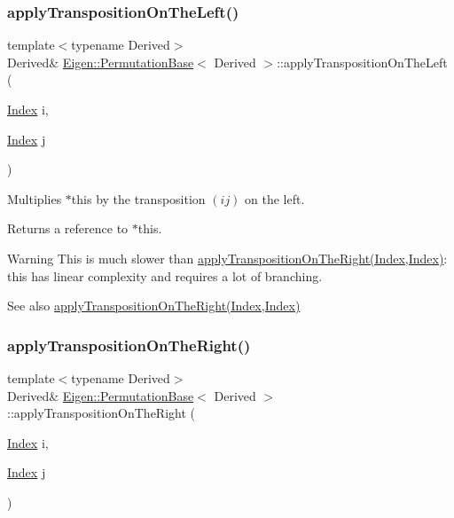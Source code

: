 \subsubsection{\texorpdfstring{applyTranspositionOnTheLeft()}{applyTranspositionOnTheLeft()}}
{\footnotesize\ttfamily template$<$typename Derived$>$ \\
Derived\& \mbox{\hyperlink{class_eigen_1_1_permutation_base}{Eigen\+::\+Permutation\+Base}}$<$ Derived $>$\+::apply\+Transposition\+On\+The\+Left (\begin{DoxyParamCaption}\item[{\mbox{\hyperlink{struct_eigen_1_1_eigen_base_a554f30542cc2316add4b1ea0a492ff02}{Index}}}]{i,  }\item[{\mbox{\hyperlink{struct_eigen_1_1_eigen_base_a554f30542cc2316add4b1ea0a492ff02}{Index}}}]{j }\end{DoxyParamCaption})\hspace{0.3cm}{\ttfamily [inline]}}

Multiplies $\ast$this by the transposition $(ij)$ on the left.

\begin{DoxyReturn}{Returns}
a reference to $\ast$this.
\end{DoxyReturn}
\begin{DoxyWarning}{Warning}
This is much slower than \mbox{\hyperlink{class_eigen_1_1_permutation_base_a5f98da0712570d0c4b12f61839ae4193}{apply\+Transposition\+On\+The\+Right(\+Index,\+Index)}}\+: this has linear complexity and requires a lot of branching.
\end{DoxyWarning}
\begin{DoxySeeAlso}{See also}
\mbox{\hyperlink{class_eigen_1_1_permutation_base_a5f98da0712570d0c4b12f61839ae4193}{apply\+Transposition\+On\+The\+Right(\+Index,\+Index)}} 
\end{DoxySeeAlso}
\mbox{\label{class_eigen_1_1_permutation_base_a5f98da0712570d0c4b12f61839ae4193}} 
\subsubsection{\texorpdfstring{applyTranspositionOnTheRight()}{applyTranspositionOnTheRight()}}
{\footnotesize\ttfamily template$<$typename Derived$>$ \\
Derived\& \mbox{\hyperlink{class_eigen_1_1_permutation_base}{Eigen\+::\+Permutation\+Base}}$<$ Derived $>$\+::apply\+Transposition\+On\+The\+Right (\begin{DoxyParamCaption}\item[{\mbox{\hyperlink{struct_eigen_1_1_eigen_base_a554f30542cc2316add4b1ea0a492ff02}{Index}}}]{i,  }\item[{\mbox{\hyperlink{struct_eigen_1_1_eigen_base_a554f30542cc2316add4b1ea0a492ff02}{Index}}}]{j }\end{DoxyParamCaption})\hspace{0.3cm}{\ttfamily [inline]}}

